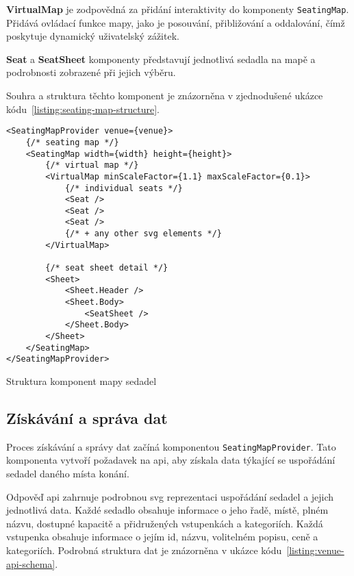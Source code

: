 \textbf{VirtualMap} je zodpovědná za přidání interaktivity do komponenty \texttt{SeatingMap}.
Přidává ovládací funkce mapy, jako je posouvání, přibližování a oddalování, čímž poskytuje dynamický uživatelský zážitek.

\textbf{Seat} a \textbf{SeatSheet} komponenty představují jednotlivá sedadla na mapě a podrobnosti zobrazené při jejich výběru.

Souhra a struktura těchto komponent je znázorněna v zjednodušené ukázce kódu~\ref{listing:seating-map-structure}.

\begin{listing}[H]
\begin{verbatim}
<SeatingMapProvider venue={venue}>
	{/* seating map */}
	<SeatingMap width={width} height={height}>
		{/* virtual map */}
		<VirtualMap minScaleFactor={1.1} maxScaleFactor={0.1}>
			{/* individual seats */}
			<Seat />
			<Seat />
			<Seat />
			{/* + any other svg elements */}
		</VirtualMap>

		{/* seat sheet detail */}
		<Sheet>
			<Sheet.Header />
			<Sheet.Body>
				<SeatSheet />
			</Sheet.Body>
		</Sheet>
	</SeatingMap>
</SeatingMapProvider>
\end{verbatim}
\caption{Struktura komponent mapy sedadel}
\label{listing:seating-map-structure}
\end{listing}

\subsection{Získávání a správa dat}
\label{subsec:implementace-seating-data}
Proces získávání a správy dat začíná komponentou \texttt{SeatingMapProvider}.
Tato komponenta vytvoří požadavek na \ac{api}, aby získala data týkající se uspořádání sedadel daného místa konání.

Odpověď \ac{api} zahrnuje podrobnou \ac{svg} reprezentaci uspořádání sedadel a jejich jednotlivá data.
Každé sedadlo obsahuje informace o jeho řadě, místě, plném názvu, dostupné kapacitě a přidružených vstupenkách a kategoriích.
Každá vstupenka obsahuje informace o jejím id, názvu, volitelném popisu, ceně a kategoriích.
Podrobná struktura dat je znázorněna v ukázce kódu~\ref{listing:venue-api-schema}.

